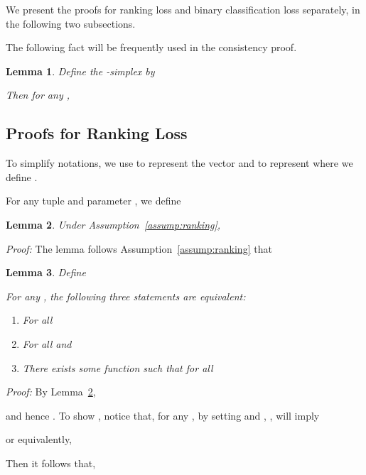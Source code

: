\documentclass[11pt,a4paper]{article}
\newtheorem{lemma}{Lemma}[section]
\begin{document}
We present the proofs for ranking loss and binary classification loss separately, in the following two subsections. 

The following fact will be frequently used in the consistency proof. 
\begin{lemma}
Define the -simplex by 

Then for any , 

\label{lem:entropy}
\end{lemma}


\subsection{Proofs for Ranking Loss}
\label{sec:proof-ranking}
To simplify notations, we use  to represent the vector  and  to represent  where we define . 


For any tuple  and parameter , we define 





 


\begin{lemma}
Under Assumption~\ref{assump:ranking}, 

\label{lemma:qi}
\end{lemma}

{\em Proof:} The lemma follows Assumption~\ref{assump:ranking} that





\begin{lemma}
Define 

For any , the following three statements are equivalent: 
\begin{enumerate}[label={(\arabic*)}]
  \item  For all  
  
  \item  For all  and  
  
  \item  There exists some function  such  that for all 
  
\end{enumerate}
\label{lem:iden}
\end{lemma}

{\em Proof:} 
By Lemma~\ref{lemma:qi},

and hence . 
To show , notice that, for any , by setting  and , ,  will imply

or equivalently,

Then it follows that, 
\end{document}
